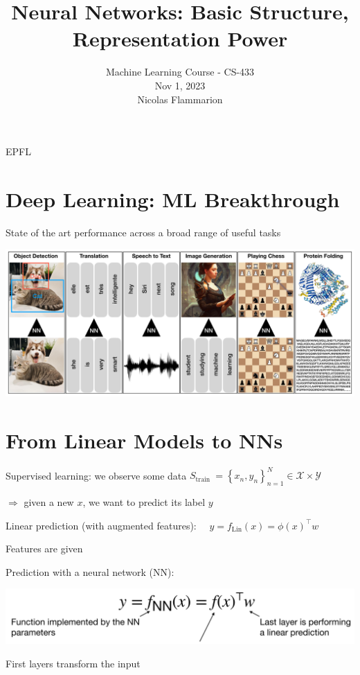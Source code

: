 \documentclass[10pt]{article}
\title{Neural Networks: Basic Structure, Representation Power }
\author{Machine Learning Course - CS-433\\
Nov 1, 2023\\
Nicolas Flammarion}
\date{}
\begin{document}
\maketitle
EPFL

\section*{Deep Learning: ML Breakthrough}
State of the art performance across a broad range of useful tasks

\begin{center}
\includegraphics[max width=\textwidth]{2024_01_08_0e0dcffe4bc8c6049046g-02}
\end{center}

\section*{From Linear Models to NNs}
Supervised learning: we observe some data $S_{\text {train }}=\left\{x_{n}, y_{n}\right\}_{n=1}^{N} \in \mathscr{X} \times \mathscr{Y}$

$\Rightarrow$ given a new $x$, we want to predict its label $y$

Linear prediction (with augmented features): $\quad y=f_{\operatorname{Lin}}(x)=\phi(x)^{\top} w$

Features are given

Prediction with a neural network (NN):

\begin{center}
\includegraphics[max width=\textwidth]{2024_01_08_0e0dcffe4bc8c6049046g-03}
\end{center}

First layers transform the input
\end{document}
